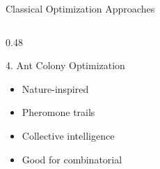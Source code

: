 \documentclass[aspectratio=169,11pt]{beamer}
\begin{document}
\begin{frame}{Classical Optimization Approaches}
\begin{columns}[T]
\begin{column}{0.48\textwidth}
            \begin{block}{4. Ant Colony Optimization}
                \begin{itemize}
                    \item Nature-inspired
                    \item Pheromone trails
                    \item Collective intelligence
                    \item Good for combinatorial
                \end{itemize}
            \end{block}
        \end{column}
    \end{columns}
\end{frame}

\end{document}

